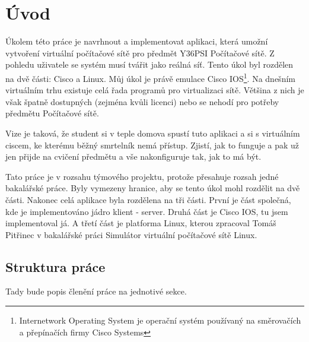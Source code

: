\chapter{Úvod} \label{uvod}


Úkolem této práce je navrhnout a implementovat aplikaci, která umožní vytvoření virtuální počítačové sítě pro předmět Y36PSI Počítačové sítě. Z pohledu uživatele se systém musí tvářit jako reálná síť. Tento úkol byl rozdělen na dvě části: Cisco a Linux. Můj úkol je právě emulace Cisco IOS\footnote{Internetwork Operating System je operační systém používaný na směrovačích a přepínačích firmy Cisco Systems}. Na dnešním virtuálním trhu existuje celá řada programů pro virtualizaci sítě. Většina z nich je však špatně dostupných (zejména kvůli licenci) nebo se nehodí pro potřeby předmětu Počítačové sítě. 

Vize je taková, že student si v teple domova spustí tuto aplikaci a  si s virtuálním ciscem, ke kterému běžný smrtelník nemá přístup. Zjistí, jak to funguje a pak už jen přijde na cvičení předmětu a vše nakonfiguruje tak, jak to má být. 

Tato práce je v rozsahu týmového projektu, protože přesahuje rozsah jedné bakalářské práce. Byly vymezeny hranice, aby se tento úkol mohl rozdělit na dvě části. Nakonec celá aplikace byla rozdělena na tři části. První je část společná, kde je implementováno jádro klient - server. Druhá část je Cisco IOS, tu jsem implementoval já. A třetí část je platforma Linux, kterou zpracoval Tomáš Pitřinec v bakalářské práci Simulátor virtuální počítačové sítě Linux.

\section{Struktura práce}
Tady bude popis členění práce na jednotivé sekce.
